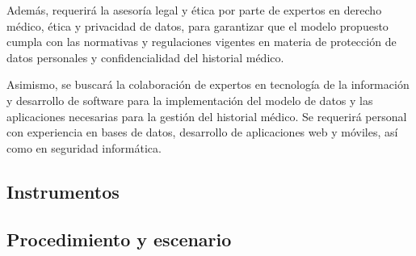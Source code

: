     Además, requerirá la asesoría legal y ética por parte de expertos en derecho médico, ética y privacidad de datos, para garantizar que el modelo propuesto cumpla con las normativas y regulaciones vigentes en materia de protección de datos personales y confidencialidad del historial médico.

    Asimismo, se buscará la colaboración de expertos en tecnología de la información y desarrollo de software para la implementación del modelo de datos y las aplicaciones necesarias para la gestión del historial médico. Se requerirá personal con experiencia en bases de datos, desarrollo de aplicaciones web y móviles, así como en seguridad informática.
    \subsection{Instrumentos}
    \subsection{Procedimiento y escenario}